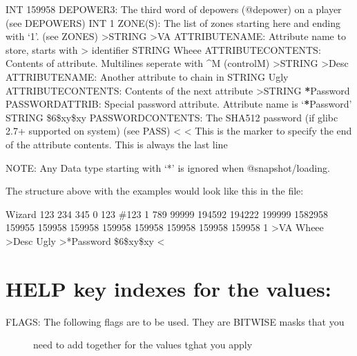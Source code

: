 \documentclass[letterpaper,10pt,english]{sphinxmanual}
\begin{document}
INT        159958   DEPOWER3: The third word of depowers (@depower) on a player  (see DEPOWERS)
INT        \sphinxhyphen{}1       ZONE(S): The list of zones starting here and ending with ‘\sphinxhyphen{}1’. (see ZONES)
\textgreater{}STRING    \textgreater{}VA      ATTRIBUTENAME: Attribute name to store, starts with \textgreater{} identifier
STRING     Wheee    ATTRIBUTECONTENTS: Contents of attribute.  Multi\sphinxhyphen{}lines seperate with \textasciicircum{}M (control\sphinxhyphen{}M)
\textgreater{}STRING    \textgreater{}Desc    ATTRIBUTENAME: Another attribute to chain in
STRING     Ugly     ATTRIBUTECONTENTS: Contents of the next attribute
\textgreater{}STRING    {\color{red}\bfseries{}*}Password PASSWORDATTRIB: Special password attribute.  Attribute name is ‘{\color{red}\bfseries{}*}Password’
STRING     \$6\$xy\$xy PASSWORDCONTENTS: The SHA512 password (if glibc 2.7+ supported on system) (see PASS)
\textless{}          \textless{}        This is the marker to specify the end of the attribute contents.  This is always the last line

\sphinxAtStartPar
NOTE:  Any Data type starting with ‘*’ is ignored when @snapshot/loading.

\sphinxAtStartPar
The structure above with the examples would look like this in the file:

Wizard
123
234
345
0
123
\#123
1
789
99999
194592
194222
199999
1582958
159955
159958
159958
159958
159958
159958
159958
159958
\sphinxhyphen{}1
\textgreater{}VA
Wheee
\textgreater{}Desc
Ugly
\textgreater{}*Password
\$6\$xy\$xy
\textless{}


\chapter{HELP key indexes for the values:}
\label{\detokenize{38-imageformat:help-key-indexes-for-the-values}}\begin{description}
\item[{FLAGS: The following flags are to be used.  They are BITWISE masks that you}] \leavevmode
\sphinxAtStartPar
need to add together for the values tghat you apply

\end{description}
\end{document}
